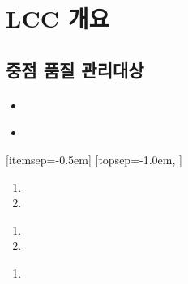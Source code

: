 \documentclass[12pt,a4paper]{book}
\begin{document}
\newpage  \null
\section{LCC 개요}


		\newpage
		\minitoc				%
		\doublespace



		\newpage   \null
		\subsection{중점 품질 관리대상}


		\newpage
	\newpage
	\paragraph{\large }


			\begin{itemize}[itemsep=0.0em]
			\item	
			\end{itemize}
			
				\begin{itemize}[itemsep=0.0em]
				
				\item	
				
				\end{itemize}	


			[itemsep=-0.5em]
			[topsep=-1.0em,			]
			
		\begin{enumerate}[itemsep=0.0em]
		\item	
		\item	
		\end{enumerate}
		
		\begin{enumerate}[ topsep=0.0em, itemsep=-0.5em ]
		\item	
		\item	
		\end{enumerate}
		
		\begin{enumerate}[ label=\arabic*), topsep=-1.0em, itemsep=-0.5em ]
		\item	
		\end{enumerate}
\end{document}
